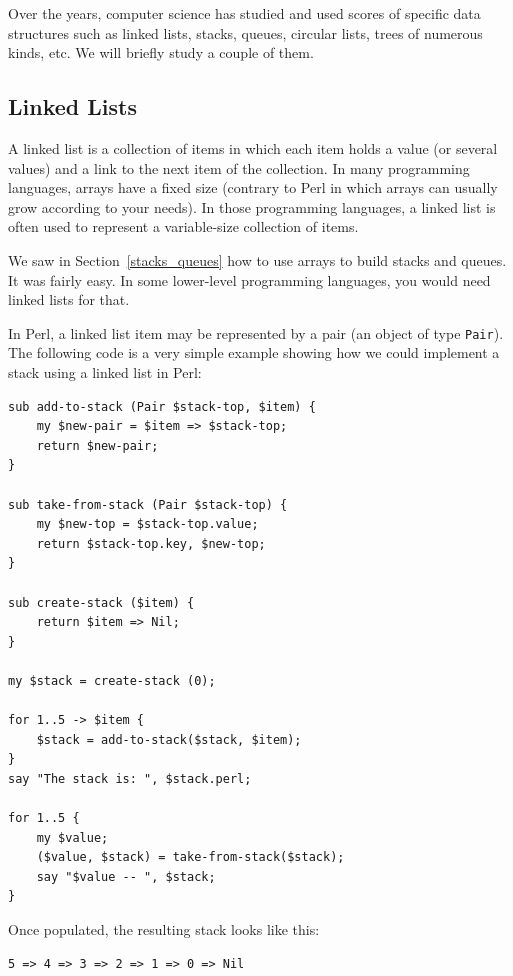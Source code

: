 Over the years, computer science has studied and used scores of 
specific data structures such as linked lists, stacks, queues, 
circular lists, trees of numerous kinds, etc. We will briefly 
study a couple of them.

\subsection{Linked Lists}
\label{linked_list}

A linked list is a collection of items in which each item holds 
a value (or several values) and a link to the next item of the 
collection. In many programming languages, arrays have a fixed 
size (contrary to Perl in which arrays can usually grow according to 
your needs). In those programming languages, a linked list 
is often used to represent a variable-size collection of items.

We saw in Section~\ref{stacks_queues} how to use arrays 
to build stacks and queues. It was fairly easy. In some 
lower-level programming languages, you would need linked 
lists for that.

In Perl, a linked list item may be represented by a pair 
(an object of type \verb'Pair'). The 
following code is a very simple example showing how 
we could implement a stack using a linked list in Perl:

\begin{verbatim}
sub add-to-stack (Pair $stack-top, $item) {
    my $new-pair = $item => $stack-top;
    return $new-pair;
}

sub take-from-stack (Pair $stack-top) {
    my $new-top = $stack-top.value;
    return $stack-top.key, $new-top;
}

sub create-stack ($item) {
    return $item => Nil;
}

my $stack = create-stack (0);

for 1..5 -> $item {
    $stack = add-to-stack($stack, $item);
}
say "The stack is: ", $stack.perl;

for 1..5 {
    my $value;
    ($value, $stack) = take-from-stack($stack);
    say "$value -- ", $stack;    
}
\end{verbatim}

Once populated, the resulting stack looks like this:

\begin{verbatim}
5 => 4 => 3 => 2 => 1 => 0 => Nil
\end{verbatim}

